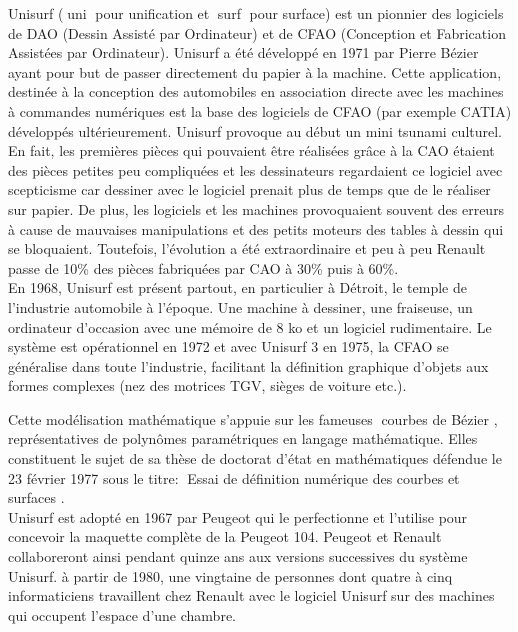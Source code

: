 \documentclass{article}
\begin{document}
Unisurf (\guillemotleft $\;$uni \guillemotright $\;$pour unification et \guillemotleft $\;$surf \guillemotright $\;$pour surface) est un pionnier des logiciels de DAO (Dessin Assist\'{e} par Ordinateur) et de CFAO (Conception et Fabrication Assist\'{e}es par Ordinateur). Unisurf a \'{e}t\'{e} d\'{e}velopp\'{e} en 1971 par Pierre B\'{e}zier ayant pour but de passer directement du papier \`{a} la machine. Cette application, destin\'{e}e \`{a} la conception des automobiles en association directe avec les machines \`{a} commandes num\'{e}riques est la base des logiciels de CFAO (par exemple CATIA) d\'{e}velopp\'{e}s ult\'{e}rieurement. Unisurf provoque au d\'{e}but un mini tsunami culturel. En fait, les premi\`{e}res pi\`{e}ces qui pouvaient \^{e}tre r\'{e}alis\'{e}es gr\^{a}ce \`{a} la CAO \'{e}taient des pi\`{e}ces petites peu compliqu\'{e}es et les dessinateurs regardaient ce logiciel avec scepticisme car dessiner avec le logiciel prenait plus de temps que de le r\'{e}aliser sur papier. De plus, les logiciels et les machines provoquaient souvent des erreurs \`{a} cause de mauvaises manipulations et des petits moteurs des tables \`{a} dessin qui se bloquaient. Toutefois, l'\'{e}volution a \'{e}t\'{e} extraordinaire et peu \`{a} peu Renault passe de 10\% des pi\`{e}ces fabriqu\'{e}es par CAO \`{a} 30\% puis \`{a} 60\%.
\\
\indent	
En 1968, Unisurf est pr\'{e}sent partout, en particulier \`{a} D\'{e}troit, le temple de l'industrie automobile \`{a} l'\'{e}poque. Une machine \`{a} dessiner, une fraiseuse, un ordinateur d'occasion avec une m\'{e}moire de 8 ko et un logiciel rudimentaire. Le syst\`{e}me est op\'{e}rationnel en 1972 et avec Unisurf 3 en 1975, la CFAO se g\'{e}n\'{e}ralise dans toute l'industrie, facilitant la d\'{e}finition graphique d'objets aux formes complexes (nez des motrices TGV, si\`{e}ges de voiture etc.).
\par
Cette mod\'{e}lisation math\'{e}matique s'appuie sur les fameuses \guillemotleft $\;$courbes de B\'{e}zier \guillemotright, repr\'{e}sentatives de polyn\^{o}mes param\'{e}triques en langage math\'{e}matique. Elles constituent le sujet de sa th\`{e}se de doctorat d'\'{e}tat en math\'{e}matiques d\'{e}fendue le 23 f\'{e}vrier 1977 sous le titre: \guillemotleft $\;$Essai de d\'{e}finition num\'{e}rique des courbes et surfaces \guillemotright.
\\
\indent	
Unisurf est adopt\'{e} en 1967 par Peugeot qui le perfectionne et l'utilise pour concevoir la maquette compl\`{e}te de la Peugeot 104. Peugeot et Renault collaboreront ainsi pendant quinze ans aux versions successives du syst\`{e}me Unisurf. \`{a} partir de 1980, une vingtaine de personnes dont quatre \`{a} cinq informaticiens travaillent chez Renault avec le logiciel Unisurf sur des machines qui occupent l'espace d'une chambre.
\end{document}

